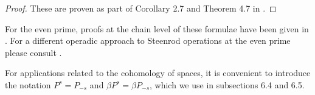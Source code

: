 \begin{proof}
	These are proven as part of Corollary 2.7 and Theorem 4.7 in \cite{may70generalapproach}.
\end{proof}

For the even prime, proofs at the chain level of these formulae have been given in \cite{medina2020cartan,brumfiel2020cochain}. For a different operadic approach to Steenrod operations at the even prime please consult \cite{chataur2005adem-cartan}.

For applications related to the cohomology of spaces, it is convenient to introduce the notation $P^s = P_{-s}$ and $\beta P^s = \beta P_{-s}$, which we use in subsections 6.4 and 6.5.

